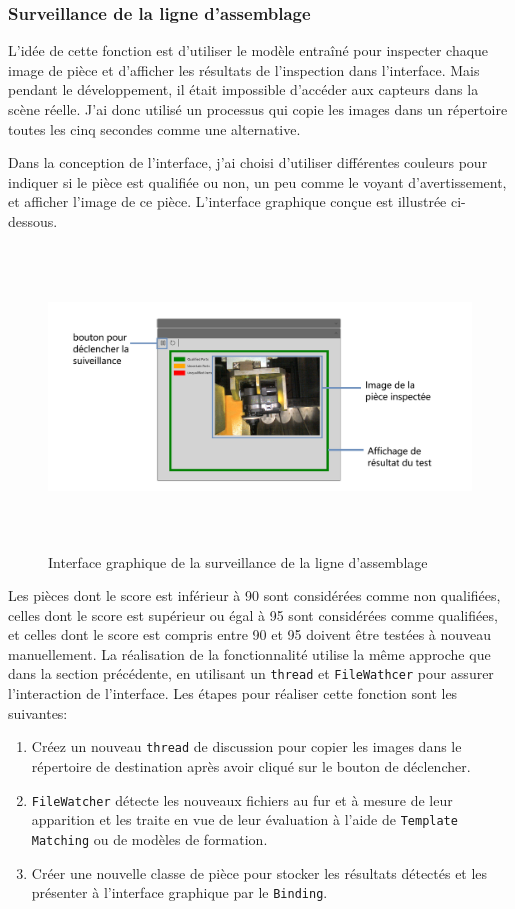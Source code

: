 \subsubsection{Surveillance de la ligne d'assemblage}
L'idée de cette fonction est d'utiliser le modèle entraîné pour inspecter chaque image de pièce et d'afficher les résultats de l'inspection dans l'interface. Mais pendant le développement, il était impossible d'accéder aux capteurs dans la scène réelle. J'ai donc utilisé un processus qui copie les images dans un répertoire toutes les cinq secondes comme une alternative. 

Dans la conception de l'interface, j'ai choisi d'utiliser différentes couleurs pour indiquer si le pièce est qualifiée ou non, un peu comme le voyant d'avertissement, et afficher l'image de ce pièce. L'interface graphique conçue est illustrée ci-dessous.
\begin{figure}[H]
    \centering
    \includegraphics[height=8cm]{ressources/images/monitoring.png}
    \caption{Interface graphique de la surveillance de la ligne d'assemblage}
\end{figure}

 Les pièces dont le score est inférieur à 90 sont considérées comme non qualifiées, celles dont le score est supérieur ou égal à 95 sont considérées comme qualifiées, et celles dont le score est compris entre 90 et 95 doivent être testées à nouveau manuellement. La réalisation de la fonctionnalité utilise la même approche que dans la section précédente, en utilisant  un \texttt{thread} et \texttt{FileWathcer} pour assurer l'interaction de l'interface. Les étapes pour réaliser cette fonction sont les suivantes: 
\begin{enumerate}
    \item Créez un nouveau \texttt{thread} de discussion pour copier les images dans le répertoire de destination après avoir cliqué sur le bouton de déclencher.
    \item \texttt{FileWatcher} détecte les nouveaux fichiers au fur et à mesure de leur apparition et les traite en vue de leur évaluation à l'aide de \texttt{Template Matching} ou de modèles de formation.
    \item Créer une nouvelle classe de pièce pour stocker les résultats détectés et les présenter à l'interface graphique par le \texttt{Binding}.
   
\end{enumerate}

